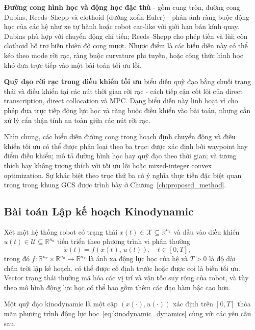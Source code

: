 \textbf{Đường cong hình học và động học đặc thù} - gồm cung tròn, đường cong
Dubins, Reeds--Shepp và clothoid (đường xoắn Euler) - phản ánh ràng buộc động
học của các hệ như xe tự hành hoặc robot car-like với giới hạn bán kính quay.
Dubins phù hợp với chuyển động chỉ tiến; Reeds--Shepp cho phép tiến và lùi; còn
clothoid hỗ trợ biến thiên độ cong mượt.
Nhược điểm là các biểu diễn này có thể kéo theo mode rời rạc, ràng buộc curvature
phi tuyến, hoặc công thức hình học khó đưa trực tiếp vào một bài toán tối ưu lồi.

\textbf{Quỹ đạo rời rạc trong điều khiển tối ưu} biểu diễn quỹ đạo bằng chuỗi
trạng thái và điều khiển tại các nút thời gian rời rạc - cách tiếp cận cốt lõi
của direct transcription, direct collocation và MPC.
Dạng biểu diễn này linh hoạt vì cho phép đưa trực tiếp động lực học và ràng buộc
điều khiển vào bài toán, nhưng cần xử lý cẩn thận tính an toàn giữa các nút rời
rạc.

Nhìn chung, các biểu diễn đường cong trong hoạch định chuyển động và điều khiển
tối ưu có thể được phân loại theo ba trục: được xác định bởi waypoint hay điểm
điều khiển; mô tả đường hình học hay quỹ đạo theo thời gian; và tương thích hay
không tương thích với tối ưu lồi hoặc mixed-integer convex optimization.
Sự khác biệt theo trục thứ ba có ý nghĩa thực tiễn đặc biệt quan trọng trong
khung GCS được trình bày ở Chương~\ref{ch:proposed_method}.

\subsection{Bài toán Lập kế hoạch Kinodynamic}\label{subsec:kinodynamic_problem}

Xét một hệ thống robot có trạng thái $x(t) \in \mathcal{X} \subseteq \mathbb{R}^{n_x}$
và đầu vào điều khiển $u(t) \in \mathcal{U} \subseteq \mathbb{R}^{n_u}$ tiến triển theo
phương trình vi phân thường
\begin{equation}
    \dot{x}(t) = f\!\left(x(t),\, u(t)\right), \quad t \in [0, T],
    \label{eq:kinodynamic_dynamics}
\end{equation}
trong đó $f \colon \mathbb{R}^{n_x} \times \mathbb{R}^{n_u} \to \mathbb{R}^{n_x}$ là ánh xạ
động lực học của hệ và $T > 0$ là độ dài chân trời lập kế hoạch, có thể được cố định trước
hoặc được coi là biến tối ưu.
Vector trạng thái thường mã hóa các vị trí và vận tốc suy rộng của robot, và tùy theo
mô hình động lực học có thể bao gồm thêm các đạo hàm bậc cao hơn.

Một quỹ đạo kinodynamic là một cặp $\left(x(\cdot), u(\cdot)\right)$ xác định trên $[0,T]$
thỏa mãn phương trình động lực học~\eqref{eq:kinodynamic_dynamics} cùng với các yêu cầu sau.


